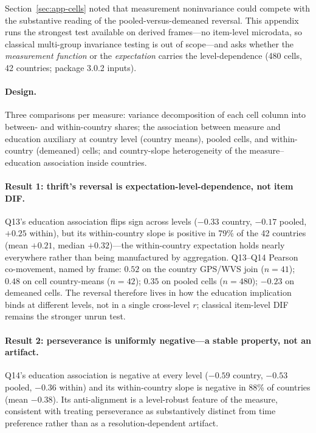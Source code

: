\documentclass[10pt,letterpaper]{article}
\begin{document}
Section~\ref{sec:app-cells} noted that measurement noninvariance could compete with the substantive reading of the pooled-versus-demeaned reversal.
This appendix runs the strongest test available on derived frames---no item-level microdata, so classical multi-group invariance testing is out of scope---and asks whether the \emph{measurement function} or the \emph{expectation} carries the level-dependence (480 cells, 42 countries; package 3.0.2 inputs).

\paragraph{Design.}
Three comparisons per measure: variance decomposition of each cell column into between- and within-country shares; the association between measure and education auxiliary at country level (country means), pooled cells, and within-country (demeaned) cells; and country-slope heterogeneity of the measure--education association inside countries.

\paragraph{Result 1: thrift's reversal is expectation-level-dependence, not item DIF.}
Q13's education association flips sign across levels ($-0.33$ country, $-0.17$ pooled, $+0.25$ within), but its within-country slope is positive in 79\% of the 42 countries (mean $+0.21$, median $+0.32$)---the within-country expectation holds nearly everywhere rather than being manufactured by aggregation.
Q13--Q14 Pearson co-movement, named by frame: $0.52$ on the country GPS/WVS join ($n=41$); $0.48$ on cell country-means ($n=42$); $0.35$ on pooled cells ($n=480$); $-0.23$ on demeaned cells.
The reversal therefore lives in how the education implication binds at different levels, not in a single cross-level $r$; classical item-level DIF remains the stronger unrun test.

\paragraph{Result 2: perseverance is uniformly negative---a stable property, not an artifact.}
Q14's education association is negative at every level ($-0.59$ country, $-0.53$ pooled, $-0.36$ within) and its within-country slope is negative in 88\% of countries (mean $-0.38$).
Its anti-alignment is a level-robust feature of the measure, consistent with treating perseverance as substantively distinct from time preference rather than as a resolution-dependent artifact.
\end{document}
